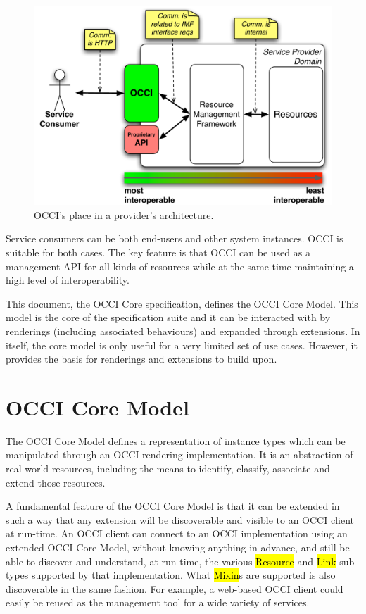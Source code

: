 \documentclass[10pt,a4paper]{article}
\begin{document}
\begin{figure}[h]
  \centering
  \includegraphics[scale=0.5]{figs/occi-intro.pdf}
  \caption{OCCI's place in a provider's architecture.}
  \label{fig:placement}
\end{figure}

Service consumers can be both end-users and other system
instances. OCCI is suitable for both cases. The key feature is that
OCCI can be used as a management API for all kinds of resources while
at the same time maintaining a high level of interoperability.

This document, the OCCI Core specification, defines the OCCI Core
Model. This model is the core of the specification suite and it can be
interacted with by renderings (including associated behaviours) and
expanded through extensions. In itself, the core model is only useful
for a very limited set of use cases. However, it provides the basis
for renderings and extensions to build upon.

\section{OCCI Core Model}
The OCCI Core Model defines a representation of instance types which
can be manipulated through an OCCI rendering implementation.  It is an
abstraction of real-world resources, including the means to identify,
classify, associate and extend those resources.

A fundamental feature of the OCCI Core Model is that it can be
extended in such a way that any extension will be discoverable and
visible to an OCCI client at run-time. An OCCI client can connect to
an OCCI implementation using an extended OCCI Core Model, without
knowing anything in advance, and still be able to discover and
understand, at run-time, the various \hl{Resource} and \hl{Link}
sub-types supported by that implementation. What \hl{Mixin}s are
supported is also discoverable in the same fashion. For example, a
web-based OCCI client could easily be reused as the management tool
for a wide variety of services.
\end{document}
